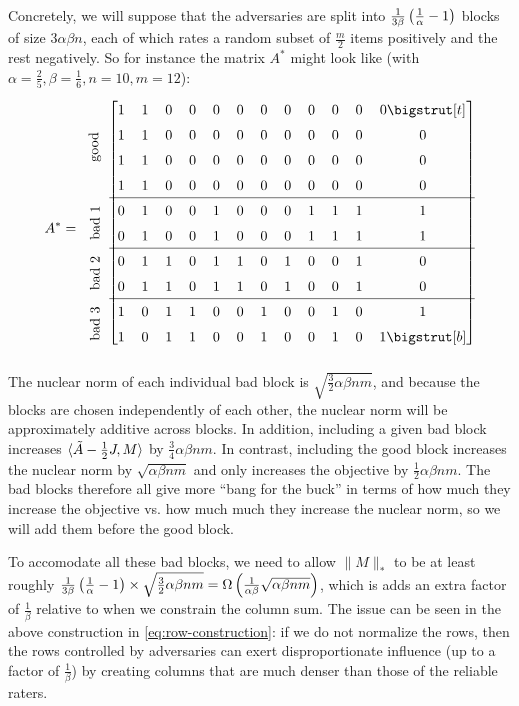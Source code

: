 Concretely, we will suppose that the adversaries are split into 
$\frac{1}{3\beta}\left( \frac{1}{\alpha}-1 \right)$ blocks of size $3\alpha\beta n$, 
each of which rates a random subset of 
$\frac{m}{2}$ items positively and the rest negatively. So for instance 
the matrix $A^*$ might look like (with $\alpha=\frac{2}{5}, \beta=\frac{1}{6}, n=10, m=12$):
\begin{equation}
\label{eq:row-construction}
\def\arraystretch{1.5}
A^* = \begin{blockarray}{c[cccccccccccc]}
\multirow{4}{*}{\rotatebox[origin=c]{90}{\textrm{good}}} 
 & 1 & 1 & 0 & 0 & 0 & 0 & 0 & 0 & 0 & 0 & 0 & 0 \topstrut \\
&  1 & 1 & 0 & 0 & 0 & 0 & 0 & 0 & 0 & 0 & 0 & 0 \\
&  1 & 1 & 0 & 0 & 0 & 0 & 0 & 0 & 0 & 0 & 0 & 0 \\
&  1 & 1 & 0 & 0 & 0 & 0 & 0 & 0 & 0 & 0 & 0 & 0 \\
\cline{2-13}
\multirow{2}{*}{\rotatebox[origin=c]{90}{\textrm{bad $1$}}}
 & 0 & 1 & 0 & 0 & 1 & 0 & 0 & 0 & 1 & 1 & 1 & 1 \\
&  0 & 1 & 0 & 0 & 1 & 0 & 0 & 0 & 1 & 1 & 1 & 1 \\
\cline{2-13}
\multirow{2}{*}{\rotatebox[origin=c]{90}{\textrm{bad $2$}}}
 & 0 & 1 & 1 & 0 & 1 & 1 & 0 & 1 & 0 & 0 & 1 & 0 \\
&  0 & 1 & 1 & 0 & 1 & 1 & 0 & 1 & 0 & 0 & 1 & 0 \\
\cline{2-13}
\multirow{2}{*}{\rotatebox[origin=c]{90}{\textrm{bad $3$}}}
 & 1 & 0 & 1 & 1 & 0 & 0 & 1 & 0 & 0 & 1 & 0 & 1 \\
&  1 & 0 & 1 & 1 & 0 & 0 & 1 & 0 & 0 & 1 & 0 & 1 \botstrut \\
\end{blockarray}
\end{equation}
The nuclear norm of each individual bad block is 
$\sqrt{\frac{3}{2}\alpha\beta nm}$, and because the blocks are 
chosen independently of each other, the nuclear norm will be approximately 
additive across blocks. In addition, including a given bad block 
increases $\langle \tilde{A} - \frac{1}{2}J, M \rangle$ by $\frac{3}{4}\alpha\beta nm$.
In contrast, including the good block increases the nuclear norm by 
$\sqrt{\alpha\beta nm}$ and only increases the objective by $\frac{1}{2}\alpha\beta nm$. The bad blocks therefore all give more ``bang for the buck'' in terms of 
how much they increase the objective vs. how much much they increase the nuclear 
norm, so we will add them before the good block.

To accomodate all these bad 
blocks, we need to allow $\|M\|_*$ to be at least roughly 
$\frac{1}{3\beta}\left( \frac{1}{\alpha}-1 \right) \times \sqrt{\frac{3}{2}\alpha\beta nm} 
= \Omega\left( \frac{1}{\alpha\beta}\sqrt{\alpha\beta nm} \right)$, which is adds an extra 
factor of $\frac{1}{\beta}$ relative to when we constrain the column sum. 
The issue can be seen in the above construction in \eqref{eq:row-construction}: 
if we do not normalize the rows, then the rows controlled by adversaries can 
exert disproportionate influence (up to a factor of $\frac{1}{\beta}$) by 
creating columns that are much denser than those of the reliable raters.
